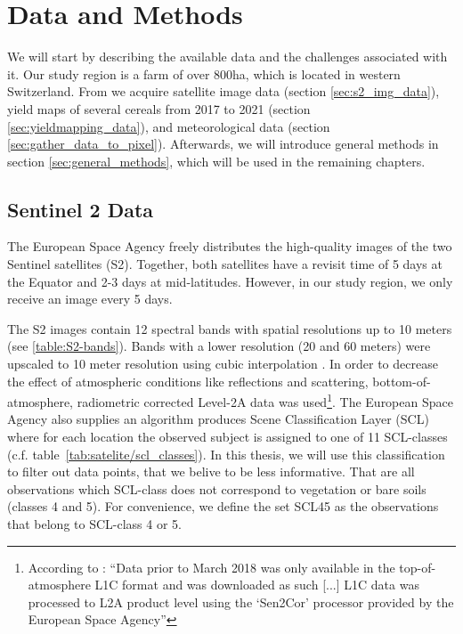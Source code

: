 \chapter{Data and Methods}\label{sec:data_methods}
{
	We will start by describing the available data and the challenges associated with it.
	Our study region is a farm of over 800ha, which is located in western Switzerland. From \cite{perichPixelbasedCropYield2022}  we acquire satellite image data (section \ref{sec:s2_img_data}), yield maps of several cereals from 2017 to 2021 (section \ref{sec:yieldmapping_data}), and meteorological data (section \ref{sec:gather_data_to_pixel}).
	Afterwards, we will introduce general methods in section \ref{sec:general_methods}, which will be used in the remaining chapters.
}


\section{Sentinel 2 Data}{
	\label{sec:s2_img_data}
	{
		The European Space Agency \citep{esaSentinel22022} freely distributes the high-quality images of the two Sentinel satellites (S2). Together, both satellites have a revisit time of 5 days at the Equator and 2-3 days at mid-latitudes. However, in our study region, we only receive an image every 5 days.
		
		
		
		The S2 images contain 12 spectral bands with spatial resolutions up to 10 meters (see \ref{table:S2-bands}). Bands with a lower resolution (20 and 60 meters) were upscaled to 10 meter resolution using cubic interpolation \citep{perichPixelbasedCropYield2022}. In order to decrease the effect of atmospheric conditions like reflections and scattering, bottom-of-atmosphere, radiometric corrected Level-2A data was used\footnote{According to \cite{perichPixelbasedCropYield2022}: ``Data prior to March 2018 was only available in the top-of-atmosphere L1C format and was downloaded as such [...] L1C data was processed to L2A product level using the `Sen2Cor' processor provided by the European Space Agency''}. 
		The European Space Agency also supplies an algorithm \citep{esaLevel2AAlgorithmOverview2022} produces Scene Classification Layer ({SCL}) where for each location the observed subject is assigned to one of 11 SCL-classes (c.f. table~\ref{tab:satelite/scl_classes}). 
		In this thesis,  we will use this classification to filter out data points, that we belive to be less informative. That are all observations which SCL-class does not correspond to vegetation or bare soils (classes 4 and 5). For convenience, we define the set SCL45 as the observations that belong to SCL-class 4 or 5.
		
}}
